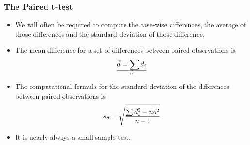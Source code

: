 \begin{frame}
\frametitle{The Paired t-test}
\begin{itemize}
\item We will often be required to compute the case-wise differences, the average of those differences and the standard deviation of those difference.

\item The mean difference for a set of differences between paired observations is
\[ \bar{d} = \sum d_i \over n \]

\item The computational formula for the standard deviation of the differences
between paired observations is
\[s_d = \sqrt{ {\sum d_i^2 - n\bar{d}^2 \over n-1}}\]
\item It is nearly always a small sample test.
\end{itemize}
\end{frame}




















